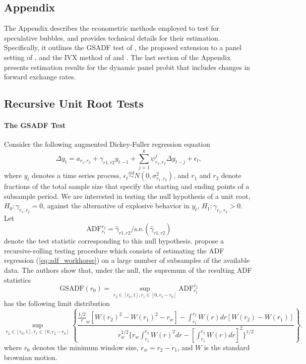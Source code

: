 \documentclass[11pt]{article}
\begin{document}
\begin{appendix}
\section{Appendix}

The Appendix describes the econometric methods employed to test for speculative bubbles, and provides technical details for their estimation. Specifically, it outlines the GSADF test of \cite{PhillipsSY2015a, PhillipsSY2015b}, the proposed extension to a panel setting of \cite{pavlidis2016}, and the IVX method of \citet{PhillipsM2009} and \citet{KostakisMS2015}. The last section of the Appendix presents estimation results for the dynamic panel probit that includes changes in forward exchange rates.

\subsection{Recursive Unit Root Tests}\label{sec:appendix_i}\label{app:ur}

\paragraph{The GSADF Test} Consider the following augmented Dickey-Fuller  regression equation 
\begin{equation}\label{eq:adf_workhorse}
\Delta y_t = a_{r_1,r_2} + \gamma_{r1,r2} y_{t-1}+\sum_{j=1}^{k} \psi_{r_1,r_2}^j
\Delta y_{t-j} + \epsilon_t,
\end{equation}
where $y_t$ denotes a time series process, $\epsilon_t \overset{iid}{\sim}N(0,\sigma_{r_1,r_2}^2)$, and $r_1$ and $r_2$ denote fractions of the total sample size that specify the starting and ending points of a subsample period. We are interested in testing the null hypothesis of a unit root, $H_0: \gamma_{r_1,r_2}=0$, against the alternative of explosive behavior in $y_t$, $H_1: \gamma_{r_1,r_2}>0$. 
Let 
\[
\text{ADF}_{r_1}^{r_2} = \widehat{\gamma}_{r1,r2}/\text{s.e.} (\widehat{\gamma}_{r1,r2})
\]
denote the test statistic corresponding to this null hypothesis. \citet{PhillipsSY2015a} propose a recursive-rolling testing procedure which consists of estimating the ADF regression (\ref{eq:adf_workhorse}) on a large number of subsamples of the available data. The authors show that, under the null, the supremum of the resulting ADF statistics 
\begin{equation*}
\text{GSADF}(r_0)=\sup_{r_2\in [r_0,1], r_1 \in [0,r_2-r_0]} {\text{ADF}_{r_1}^{r_2}}
\end{equation*}
has the following limit distribution
\[
 \sup_{r_2 \in [r_0,1], r_1 \in [0,r_2-r_0]} \left\{\frac{\frac{1/2}r_w [W(r_2)^2-W(r_1)^2-r_w]-  \int_{r_1}^{r_2} W(r) dr[W(r_2)-W(r_1)]}{r_w^{1/2}\{r_w  \int_{r_1}^{r_2} W(r)^2dr- [\int_{r_1}^{r_2}W(r) dr]^2 \}^{1/2}} \right\}.
\]
where $r_0$ denotes the minimum window size, $r_w=r_2-r_1$, and $W$ is the standard brownian motion. 


\end{appendix}
\end{document}
